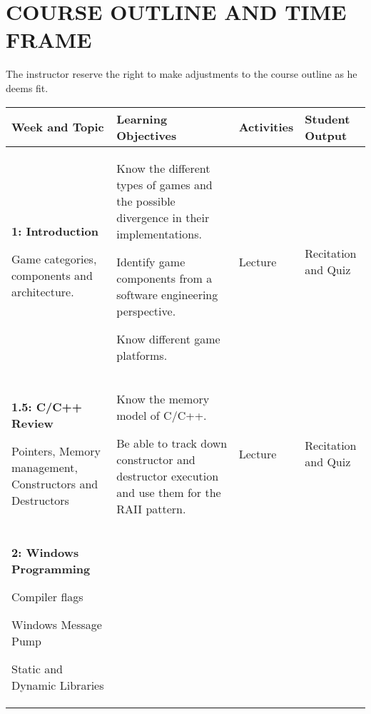 \documentclass[10pt]{article}
\newenvironment{itemize*}{
\begin{itemize}[leftmargin=1em,noitemsep,nolistsep]
}{\end{itemize}}
\begin{document}
\section{COURSE OUTLINE AND TIME FRAME}
The instructor reserve the right to make adjustments to the course outline as he deems fit.
\begin{longtable}{||p{1.8in}|p{2.4in}|p{1.3in}|p{1in}||}
\hline
\textbf{Week and Topic} & \textbf{Learning Objectives} & \textbf{Activities} & \textbf{Student Output} \\ \hline

\textbf{1: Introduction}	\begin{itemize*}
		\item Game categories, components and architecture.
	\end{itemize*} & \begin{itemize*}
		\item Know the different types of games and the possible divergence in their implementations.
		\item Identify game components from a software engineering perspective.
		\item Know different game platforms.
	\end{itemize*} &
	\begin{itemize*}
		\item Lecture
	\end{itemize*} & Recitation and Quiz \\ \hline
\textbf{1.5: C/C++ Review}\begin{itemize*}
		\item Pointers, Memory management, Constructors and Destructors
	\end{itemize*} & \begin{itemize*}
		\item Know the memory model of C/C++.
		\item Be able to track down constructor and destructor execution and use them for the RAII pattern.
	\end{itemize*} &
	\begin{itemize*}
		\item Lecture
	\end{itemize*} & Recitation and Quiz \\ \hline
\textbf{2: Windows Programming} 
	\begin{itemize*}
	 \item Compiler flags
	 \item Windows Message Pump
	 \item Static and Dynamic Libraries

\end{itemize*}
\end{longtable}
\end{document}
